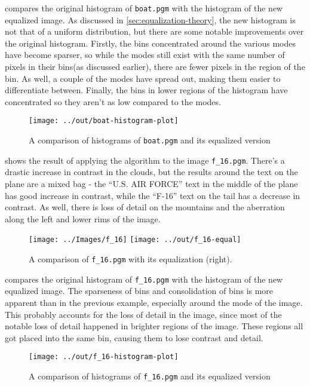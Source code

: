\documentclass[headings=optiontoheadandtoc,listof=totoc,parskip=full]{scrartcl}
\begin{document}
 compares the original histogram of \texttt{boat.pgm} with the histogram of the new equalized image. As discussed in \cref{sec:equalization-theory}, the new histogram is not that of a uniform distribution, but there are some notable improvements over the original histogram. Firstly, the bins concentrated around the various modes have become sparser, so while the modes still exist with the same number of pixels in their bins(as discussed earlier), there are fewer pixels in the region of the bin. As well, a couple of the modes have spread out, making them easier to differentiate between. Finally, the bins in lower regions of the histogram have concentrated so they aren't as low compared to the modes.

\begin{figure}[H]
	\centering\texttt{[image: ../out/boat-histogram-plot]}
	\caption{A comparison of histograms of \texttt{boat.pgm} and its equalized version}
	\label{fig:equal-histogram-1}
\end{figure}

 shows the result of applying the algorithm to the image \texttt{f\_16.pgm}. There's a drastic increase in contrast in the clouds, but the results around the text on the plane are a mixed bag - the ``U.S. AIR FORCE'' text in the middle of the plane has good increase in contrast, while the ``F-16'' text on the tail has a decrease in contrast. As well, there is loss of detail on the mountains and the aberration along the left and lower rims of the image.

\begin{figure}[H]
	\centering
	\texttt{[image: ../Images/f\_16]}
	\texttt{[image: ../out/f\_16-equal]}
	\caption{A comparison of \texttt{f\_16.pgm} with its equalization (right).}
	\label{fig:equal-result-2}
\end{figure}

 compares the original histogram of \texttt{f\_16.pgm} with the histogram of the new equalized image. The sparseness of bins and consolidation of bins is more apparent than in the previous example, especially around the mode of the image. This probably accounts for the loss of detail in the image, since most of the notable loss of detail happened in brighter regions of the image. These regions all got placed into the same bin, causing them to lose contrast and detail.

\begin{figure}[H]
	\centering\texttt{[image: ../out/f\_16-histogram-plot]}
	\caption{A comparison of histograms of \texttt{f\_16.pgm} and its equalized version}
	\label{fig:equal-histogram-2}
\end{figure}
\end{document}
